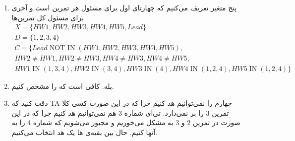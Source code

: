 \begin{enumerate}
    \item پنج متغیر تعریف می‌کنیم که چهارتای اول برای مسئول هر تمرین است و آخری برای مسئول کل تمرین‌ها
    \begin{gather*}
        X = \{HW1, HW2, HW3, HW4, HW5, Lead\}\\
        D = \{1, 2, 3, 4\}\\
        C = \{Lead \operatorname{NOT ~ IN} (HW1, HW2, HW3, HW4, HW5),\\
        HW2 \ne HW1, HW2 \ne HW3, HW4 \ne HW3, HW4 \ne HW5,\\
        HW1 \operatorname{IN} (1, 3, 4), HW2 \operatorname{IN} (3, 4), HW3 \operatorname{IN} (4), HW4 \operatorname{IN} (1, 2, 4), HW5 \operatorname{IN} (1, 2, 4)
        \}
    \end{gather*}
    \begin{center}
    \end{center}
    \item بله. کافی است که  را مشخص کنیم.
    \item دقت کنید که TA چهارم را نمی‌توانیم هد کنیم چرا که در این صورت کسی کلا تمرین 3 را بر نمی‌دارد.
    تی‌ای شماره 3 هم نمی‌توانیم هد کنیم چرا که در این صورت در تمرین 2 و 3 به مشکل می‌خوریم و مجبور می‌شویم که شماره 4
    را به آنها  کنیم.
    حال بین بقیه‌ی ها یک هد انتخاب می‌کنیم.


\end{enumerate}

